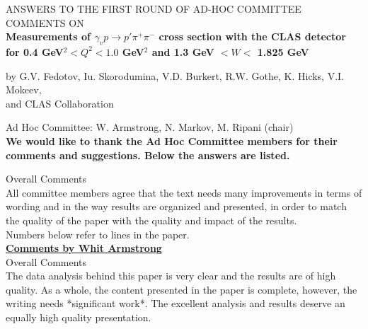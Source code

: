 \documentclass[,superscriptaddress,showpacs,amssymb,amsmath,amsfonts,linenumbers,article]{revtex4-1}
\begin{document}
\begin{center}
\vspace{2cm}
{\Large ANSWERS TO THE FIRST ROUND OF AD-HOC COMMITTEE COMMENTS ON}\\[0.7cm]  

{\bf \large
Measurements of $\gamma_{v} p \rightarrow p' \pi^{+} \pi^{-}$ cross section with the CLAS detector for 0.4 GeV$^2 < Q^2 < 1.0$ GeV$^2$ and 1.3 GeV $< W <$ 1.825 GeV \\[0.7cm]}

by G.V. Fedotov, Iu. Skorodumina, V.D. Burkert, R.W. Gothe, K. Hicks, V.I. Mokeev,\\ and CLAS Collaboration\\[0.5cm]
\end{center}


Ad Hoc Committee: W. Armstrong, N. Markov, M. Ripani (chair)\\[1.5cm] 


\vspace{1cm}
{\bf We would like to thank the Ad Hoc Committee members for their comments and suggestions. Below the answers are listed.  }

\vspace{1cm}


Overall Comments\\[0.5cm]

All committee members agree that the text needs many improvements in terms of wording and in the way results are organized and presented, in order to match the quality of the paper with the quality and impact of the results.\\[0.5cm]

Numbers below refer to lines in the paper.\\[0.5cm]





\vspace{1cm}
\underline{\bf Comments by Whit Armstrong}\\[1cm]

Overall Comments\\[0.5cm]


The data analysis behind this paper is very clear and the results are of high quality. As a whole, the content presented in the paper is complete, however, the writing needs *significant work*. The excellent analysis and results deserve an equally high quality presentation.\\[0.5cm]
\end{document}
